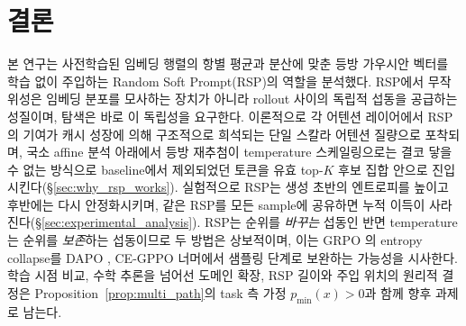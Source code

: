
\section{결론}\label{sec:conclusion}

본 연구는 사전학습된 임베딩 행렬의 항별 평균과 분산에 맞춘 등방 가우시안 벡터를 학습 없이 주입하는 Random Soft Prompt(RSP)의 역할을 분석했다. RSP에서 무작위성은 임베딩 분포를 모사하는 장치가 아니라 rollout 사이의 독립적 섭동을 공급하는 성질이며, 탐색은 바로 이 독립성을 요구한다. 이론적으로 각 어텐션 레이어에서 RSP의 기여가 캐시 성장에 의해 구조적으로 희석되는 단일 스칼라 어텐션 질량으로 포착되며, 국소 affine 분석 아래에서 등방 재추첨이 temperature 스케일링으로는 결코 닿을 수 없는 방식으로 baseline에서 제외되었던 토큰을 유효 top-$K$ 후보 집합 안으로 진입시킨다(\S\ref{sec:why_rsp_works}). 실험적으로 RSP는 생성 초반의 엔트로피를 높이고 후반에는 다시 안정화시키며, 같은 RSP를 모든 sample에 공유하면 누적 이득이 사라진다(\S\ref{sec:experimental_analysis}). RSP는 순위를 \emph{바꾸는} 섭동인 반면 temperature는 순위를 \emph{보존}하는 섭동이므로 두 방법은 상보적이며, 이는 GRPO \citep{shao2024deepseekmath}의 entropy collapse를 DAPO \citep{yu2025dapo}, CE-GPPO \citep{su2025cegppo} 너머에서 샘플링 단계로 보완하는 가능성을 시사한다. 학습 시점 비교, 수학 추론을 넘어선 도메인 확장, RSP 길이와 주입 위치의 원리적 결정은 Proposition~\ref{prop:multi_path}의 task 측 가정 $p_{\min}(x){>}0$과 함께 향후 과제로 남는다.
